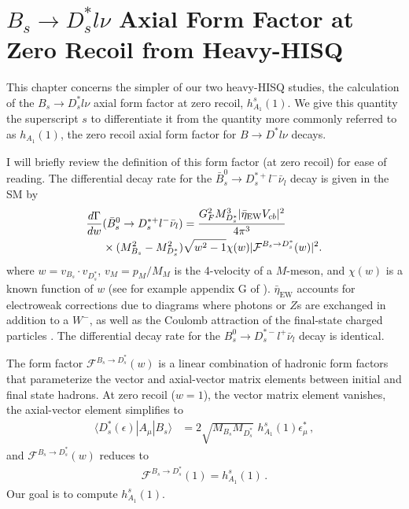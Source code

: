 ﻿﻿\chapter{$B_s\to D_s^*l\nu$ Axial Form Factor at Zero Recoil from Heavy-HISQ}
\label{chap:BsDsstar}

This chapter concerns the simpler of our two heavy-HISQ studies, the calculation of the $B_s\to D^*_sl\nu$ axial form factor at zero recoil, $h^s_{A_1}(1)$. We give this quantity the superscript $s$ to differentiate it from the quantity more commonly referred to as $h_{A_1}(1)$, the zero recoil axial form factor for $B\to D^*l\nu$ decays.

I will briefly review the definition of this form factor (at zero recoil) for ease of reading. The differential decay rate for the $\bar{B}_s^0\to D_s^{*+} l^- \bar{\nu}_l$ decay is given in the SM by
\begin{align}
  {d \Gamma \over dw} &(\bar{B}_s^0\to D_s^{*+} l^- \bar{\nu}_l) = {G_F^2 M_{D_s^*}^3 | \bar{\eta}_{\text{EW}} V_{cb} |^2 \over 4\pi^3}
\\  &\times(M_{B_s}^2-M_{D_s^*}^2) \sqrt{w^2-1} \chi(w) | \mathcal{F}^{B_s\to D_s^*}(w) |^2. \nonumber
\end{align}
where $w = v_{B_s} \cdot v_{D^*_s}$, $v_M = p_M/M_M$ is the 4-velocity of a $M$-meson, and $\chi(w)$ is a known function of $w$ (see for example appendix G of \cite{Harrison:2017fmw}). $\bar{\eta}_{\text{EW}}$ accounts for electroweak corrections due to diagrams where photons or $Z$s are exchanged in addition to a $W^-$, as well as the Coulomb attraction of the final-state charged particles \cite{SIRLIN198283,Ginsberg1968,PhysRevD.41.1736}. The differential decay rate for the $B_s^0\to D_s^{*-} l^+ \bar{\nu}_l$ decay is identical.

The form factor $\mathcal{F}^{B_s\to D_s^*}(w)$ is a linear combination of hadronic form factors that parameterize the vector and axial-vector matrix elements between initial and final state hadrons. At zero recoil ($w=1$), the vector matrix element vanishes, the axial-vector element simplifies to
\begin{align}
  \langle D^*_s(\epsilon)| A_{\mu} | B_s \rangle &= 2 \sqrt{M_{B_s}M_{D^*_s}}\,\, h^s_{A_1}(1) \epsilon^{*}_{\mu}\,,
\end{align}
and $\mathcal{F}^{B_s\to D_s^*}(w)$ reduces to
\begin{align}
  \mathcal{F}^{B_s\to D_s^*}(1) = h^s_{A_1}(1)\,.
\end{align}
Our goal is to compute $h^s_{A_1}(1)$.

